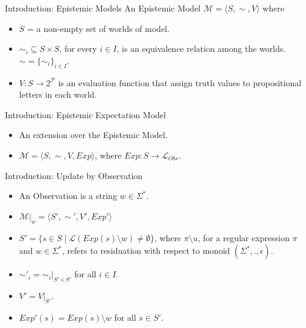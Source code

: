 \documentclass{beamer}
\newcommand\ldiaarg[1]{\langle#1\rangle}
\newcommand{\M}{\mathcal{M}}
\newcommand{\LL}{\mathcal{L}} %
\begin{document}
\begin{frame}{Introduction: Epistemic Models}
   An Epistemic Model $\M = \ldiaarg{S, \sim, V}$ where
   \begin{itemize}
       \item<1-> $S$ = a non-empty set of worlds of model.
       \item<2-> $\sim_i\subseteq S\times S$, for every $i\in I$, is an equivalence relation among the worlds. $\sim = \{ \sim_i\}_{i\in I}$.
       \item<3-> $V:S\rightarrow 2^{\mathcal{P}}$ is an evaluation function that assign truth values to propositional letters in each world.
   \end{itemize}
\end{frame}

\begin{frame}{Introduction: Epistemic Expectation Model}
    \begin{itemize}
        \item<1-> An extension over the Epistemic Model.
        \item<2-> $\M = \ldiaarg{S, \sim, V, Exp}$, where $Exp: S\rightarrow\LL_{Obs}$.
    \end{itemize}
\end{frame}

\begin{frame}{Introduction: Update by Observation}
    \begin{itemize}
        \item<1-> An Observation is a string $w\in\Sigma^*$.
        \item<2-> $\M|_w = \ldiaarg{S', \sim', V', Exp'}$
        \item<3-> $S' = \{s\in S\mid \LL(Exp(s)\setminus w)\neq\emptyset\}$, where $\pi\setminus u$, for a regular expression $\pi$ and $w\in\Sigma^*$, refers to residuation with respect to monoid $(\Sigma^*, ., \epsilon)$.
        \item<4-> $\sim'_i = \sim_i|_{S'\times S'}$ for all $i\in I$.
        \item<5-> $V' = V|_{S'}$.
        \item<6-> $Exp'(s) = Exp(s)\setminus w$ for all $s\in S'$.
    \end{itemize}
\end{frame}
\end{document}
